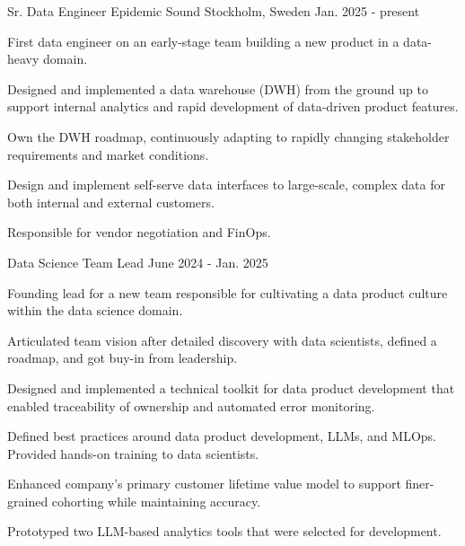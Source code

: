 

\begin{cventries}


  \cventry
    {Sr. Data Engineer} %
    {Epidemic Sound} %
    {Stockholm, Sweden} %
    {Jan. 2025 - present} %
    {
    First data engineer on an early-stage team building a new product in a data-heavy domain.
    \vspace{5.0mm}
      \begin{cvitems} %
        \item {Designed and implemented a data warehouse (DWH) from the ground up to support internal analytics and rapid development of data-driven product features.}
        \item {Own the DWH roadmap, continuously adapting to rapidly changing stakeholder requirements and market conditions.}
        \item {Design and implement self-serve data interfaces to large-scale, complex data for both internal and external customers.}
        \item {Responsible for vendor negotiation and FinOps.}
      \end{cvitems}
    }

  \vspace{-1.0mm}
  \cventry
    {Data Science Team Lead} %
    {} %
    {} %
    {June 2024 - Jan. 2025} %
    {
    Founding lead for a new team responsible for cultivating a data product culture within the data science domain.
    \vspace{5.0mm}
      \begin{cvitems} %
        \item {Articulated team vision after detailed discovery with data scientists, defined a roadmap, and got buy-in from leadership. }
        \item {Designed and implemented a technical toolkit for data product development that enabled traceability of ownership and automated error monitoring. }
        \item {Defined best practices around data product development, LLMs, and MLOps. Provided hands-on training to data scientists. }
        \item {Enhanced company's primary customer lifetime value model to support finer-grained cohorting while maintaining accuracy. }
        \item {Prototyped two LLM-based analytics tools that were selected for development. }
      \end{cvitems}
    }


\end{cventries}
